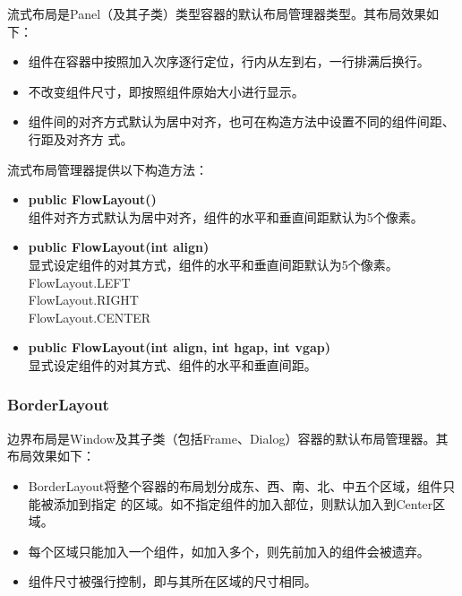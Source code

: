 流式布局是Panel（及其子类）类型容器的默认布局管理器类型。其布局效果如下：

\begin{itemize}\kai
\item 组件在容器中按照加入次序逐行定位，行内从左到右，一行排满后换行。
\item 不改变组件尺寸，即按照组件原始大小进行显示。
\item 组件间的对齐方式默认为居中对齐，也可在构造方法中设置不同的组件间距、行距及对齐方
  式。
\end{itemize}

流式布局管理器提供以下构造方法：

\begin{itemize}\kai
\item {\bf public FlowLayout()}\\
  组件对齐方式默认为居中对齐，组件的水平和垂直间距默认为5个像素。

\item {\bf public FlowLayout(int align)}\\
  显式设定组件的对其方式，组件的水平和垂直间距默认为5个像素。\\
  FlowLayout.LEFT \\
  FlowLayout.RIGHT\\
  FlowLayout.CENTER\\

\item {\bf public FlowLayout(int align, int hgap, int vgap)}\\
  显式设定组件的对其方式、组件的水平和垂直间距。
\end{itemize}



\subsubsection{BorderLayout}

边界布局是Window及其子类（包括Frame、Dialog）容器的默认布局管理器。其布局效果如下：

\begin{itemize}
\item BorderLayout将整个容器的布局划分成东、西、南、北、中五个区域，组件只能被添加到指定
  的区域。如不指定组件的加入部位，则默认加入到Center区域。
\item 每个区域只能加入一个组件，如加入多个，则先前加入的组件会被遗弃。
\item 组件尺寸被强行控制，即与其所在区域的尺寸相同。
\end{itemize}

